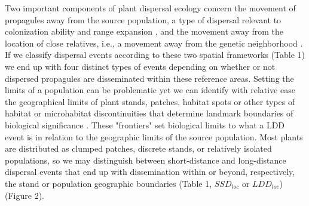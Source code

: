 \documentclass[a4paper, 12pt]{article}
\begin{document}
\begin{linenumbers}
Two important components of plant dispersal ecology concern the movement of propagules away from the source population, a type of dispersal relevant to colonization ability and range expansion \citep{Howe:2004}, and the movement away from the location of close relatives, i.e., a movement away from the genetic neighborhood \citep{Hardesty:2006lr,Jones:2008il}. If we classify dispersal events according to these two spatial frameworks (Table 1) we end up with four distinct types of events depending on whether or not dispersed propagules are disseminated within these reference areas. Setting the limits of a population can be problematic \citep{Waples:2006ev} yet we can identify with relative ease the geographical limits of plant stands, patches, habitat spots or other types of habitat or microhabitat discontinuities that determine landmark boundaries of biological significance \citep[see][for further discussion of boundaries for dispersal]{Kinlan:2005fb}. These "frontiers" set biological limits to what a LDD event is in relation to the geographic limits of the source population. Most plants are distributed as clumped patches, discrete stands, or relatively isolated populations, so we may distinguish between short-distance and long-distance dispersal events that end up with dissemination within or beyond, respectively, the stand or population geographic boundaries (Table 1, $SSD_{loc}$ or $LDD_{loc}$) (Figure 2).  


\end{linenumbers}
\end{document}
